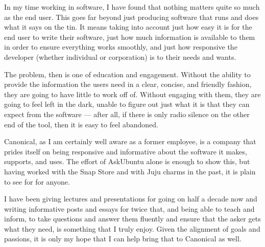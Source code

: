 In my time working in software, I have found that nothing matters quite so much as the end user. This goes far beyond just producing software that runs and does what it says on the tin. It means taking into account just how easy it is for the end user to write their software, just how much information is available to them in order to ensure everything works smoothly, and just how responsive the developer (whether individual or corporation) is to their needs and wants.

The problem, then is one of education and engagement. Without the ability to provide the information the users need in a clear, concise, and friendly fashion, they are going to have little to work off of. Without engaging with them, they are going to feel left in the dark, unable to figure out just what it is that they can expect from the software --- after all, if there is only radio silence on the other end of the tool, then it is easy to feel abandoned.

Canonical, as I am certainly well aware as a former employee, is a company that prides itself on being responsive and informative about the software it makes, supports, and uses. The effort of AskUbuntu alone is enough to show this, but having worked with the Snap Store and with Juju charms in the past, it is plain to see for for anyone.

I have been giving lectures and presentations for going on half a decade now and writing informative posts and essays for twice that, and being able to teach and inform, to take questions and answer them fluently and ensure that the asker gets what they need, is something that I truly enjoy. Given the alignment of goals and passions, it is only my hope that I can help bring that to Canonical as well.
